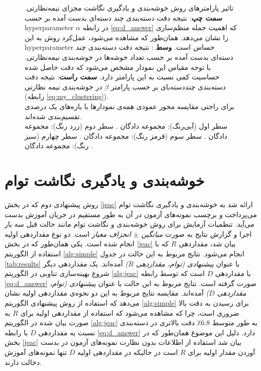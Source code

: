 \begin{figure}[!h]
\begin{subfigure}[b]{0.3\linewidth}
  \end{subfigure}
  \caption[تحلیل پارامترهای روش دسته‌بندی با خوشه‌بندی نیمه‌نظارتی]{
  تاثیر پارامترهای  روش خوشه‌بندی و یادگیری نگاشت مجزای نیمه‌نظارتی.    \textbf{سمت چپ}: نتیجه دقت دسته‌بندی چند دسته‌ای بدست آمده بر حسب \gls{hyperparameter}  $\alpha$ در رابطه
 \eqref{eq:d_answer}
 که اهمیت جمله منظم‌سازی را نشان می‌دهد. همان‌طور که مشاهده می‌شود، عمل‌کرد روش به این \gls{hyperparameter} حساس است.
 \textbf{وسط }:
 نتیجه دقت  دسته‌بندی چند دسته‌ای بدست آمده بر حسب تعداد خوشه‌ها در خوشه‌بندی نیمه‌نظارتی. با توجه مقیاس این نمودار مشخص می‌شود که دقت حاصل شده حساسیت کمی نسبت به این پارامتر دارد.
  \textbf{سمت راست}:
  نتیجه دقت دسته‌بندی چنددسته‌بای بر حسب پارامتر $\beta$ در خوشه‌بندی نیمه نظارتی (رابطه \eqref{eq:my_clustering}).\\
  برای راحتی مقایسه محور عمودی  همه‌ی نمودارها با بازه‌های یک درصدی تقسیم‌بندی شده‌اند.\\
سطر اول (آبی‌رنگ): مجموعه دادگان . سطر دوم (زرد رنگ): مجموعه دادگان . سطر سوم (قرمز رنگ): مجموعه دادگان . سطر چهارم (سبز رنگ): مجموعه دادگان .
 }
  \label{fig:simple_params}
  \end{figure}




\section{ خوشه‌بندی و یادگیری نگاشت توام}\label{exp:jeac}
\label{exp:cluster}
روش پیشنهادی دوم که در بخش \ref{jeac} ارائه شد به خوشه‌بندی و یادگیری نگاشت توام می‌پرداخت و برچسب نمونه‌های آزمون در آن به طور مستقیم در جریان آموزش بدست می‌آید.
تنظمیات آزمایش برای روش خوشه‌بندی و نگاشت توام مانند حالت قبل سه بار اجرا و گزارش نتایج به صورت \textit{ میانگین $\pm$ انحراف معیار } است. دو نوع  مقداردهی اولیه انجام شده است. یکی همان‌طور که در بخش \ref{jeac} بیان شد، مقداردهی $R$ که با استفاده از الگوریتم
\ref{alg:simple}
انجام می‌شود. نتایج مربوط به این حالت در جدول  \ref{tab:results} با عنوان
\textit{ پیشنهادی (توام، مقداردهی $R$)}
آمده‌اند. یک مقداردهی دیگر شروع بهینه‌سازی تناوبی در الگوریتم
\ref{alg:jeac}
 با مقداردهی $D$ است که توسط رابطه
\eqref{eq:d_answer}
صورت گرفته است. نتایج مربوط به این حالت با عنوان
\textit{پیشنهادی (توام، مقداردهی $D$)}
آمده‌اند. مقایسه نتایج مربوط به این دو نحوه‌ی مقداردهی اولیه نشان می‌دهد که استفاده از روش پیشنهادی الگوریتم \ref{alg:simple}  برای رسیدن به دقت بالا ضروری است، چرا که مشاهده می‌شود که استفاده از مقداردهی اولیه برای $R$ به صورت بیان شده در الگوریتم \ref{alg:jeac} به طور متوسط $6.8$٪ دقت بالاتری در دسته‌بندی نسبت به مقداردهی $D$  با رابطه \eqref{eq:d_answer} دارد. دلیل این موضوع همان‌طور که در بخش \ref{jeac} بیان شد استفاده از اطلاعات بدون نظارت نمونه‌های آزمون در بدست آوردن مقدار اولیه برای $R$ است در حالیکه در مقداردهی اولیه $D$ تنها نمونه‌های آموزش دخالت دارند.

